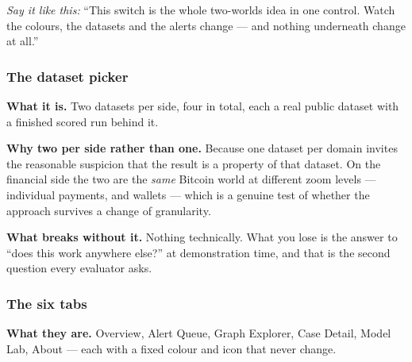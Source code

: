 \documentclass[11pt,a4paper]{article}
\newcommand{\aloud}[1]{\par\smallskip\noindent\textit{\textcolor{accent}{Say
it like this:}} ``#1''\par\smallskip}
\begin{document}
\aloud{This switch is the whole two-worlds idea in one control. Watch the
colours, the datasets and the alerts change --- and nothing underneath change at
all.}

\subsubsection*{The dataset picker}

\textbf{What it is.} Two datasets per side, four in total, each a real public
dataset with a finished scored run behind it.

\textbf{Why two per side rather than one.} Because one dataset per domain
invites the reasonable suspicion that the result is a property of that dataset.
On the financial side the two are the \emph{same} Bitcoin world at different
zoom levels --- individual payments, and wallets --- which is a genuine test of
whether the approach survives a change of granularity.

\textbf{What breaks without it.} Nothing technically. What you lose is the
answer to ``does this work anywhere else?'' at demonstration time, and that is
the second question every evaluator asks.

\subsubsection*{The six tabs}

\textbf{What they are.} Overview, Alert Queue, Graph Explorer, Case Detail,
Model Lab, About --- each with a fixed colour and icon that never change.
\end{document}
